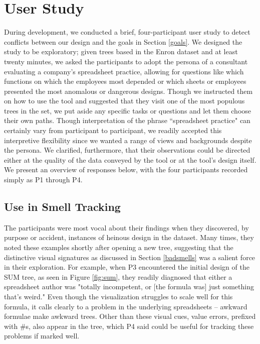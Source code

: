 \documentclass[conference]{IEEEtran}
\begin{document}
	\section{User Study} \label{sec:userstudy} During development, we conducted a
	brief, four-participant user study to detect conflicts between our
	design and the goals in Section \ref{goals}. We designed the study to be
	exploratory; given trees based in the Enron dataset and at least twenty
	minutes, we asked the participants to adopt the persona of a consultant
	evaluating a company's spreadsheet practice, allowing for questions like which
	functions on which the employees most depended or which sheets or employees
	presented the most anomalous or dangerous designs. Though we instructed them on
	how to use the tool and suggested that they visit one of the most populous
	trees in the set, we put aside any specific tasks or questions and let them
	choose their own paths. Though interpretation of the phrase ``spreadsheet
	practice" can certainly vary from participant to participant, we readily
	accepted this interpretive flexibility since we wanted a range of views and
	backgrounds despite the persona. We clarified, furthermore, that their
	observations could be directed either at the quality of the data conveyed by
	the tool or at the tool's design itself. We present an overview of responses below, with the four participants
	recorded simply as P1 through P4. \par
	
	\subsection{Use in Smell Tracking} 
	
	The participants were most vocal about their findings when they discovered, by
	purpose or accident, instances of heinous design in the dataset. Many times,
	they noted these examples shortly after opening a new tree, suggesting that the
	distinctive visual signatures as discussed in Section \ref{badsmells} was a
	salient force in their exploration. For example, when P3 encountered the
	initial design of the SUM tree, as seen in Figure \ref{fig:sum}, they readily
	diagnosed that either a spreadsheet author was "totally incompetent, or [the
	formula was] just something that's weird." Even though the visualization struggles
	to scale well for this formula, it calls clearly to a problem in the underlying
	spreadsheets -- awkward formulae make awkward trees. Other than these visual cues, value
	errors, prefixed with \#s, also appear in the tree, which P4 said could be
	useful for tracking these problems if marked well. 
	
\end{document}
